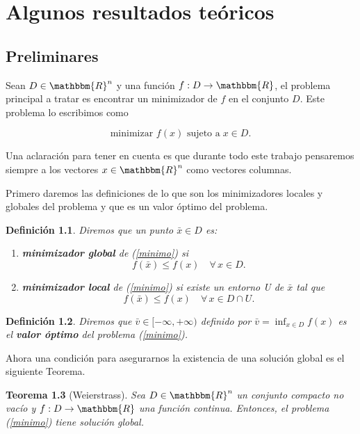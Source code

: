 \documentclass[a4paper,12pt]{report}
\newcommand{\RR}{\mathbbm{R}}
\newcommand{\Rn}{\RR^n}
\newcommand{\bx}{\bar{x}}
\newcommand{\arr}{\rightarrow}
\newtheorem{teo}{Teorema}[section]
\newtheorem{defi}[teo]{Definici\'on}
\begin{document}
\chapter{Algunos resultados te\'oricos}
\section{Preliminares}

Sean $D \in \Rn$ y una funci\'on $f: D \arr \RR$, el problema principal a tratar es encontrar un minimizador de $f$ en el conjunto $D$. Este problema lo escribimos como

\begin{equation}\label{minimo}
 \mbox{minimizar}\,\,f(x)\,\, \mbox{sujeto a}\;x \in D. 
\end{equation}

Una aclaraci\'on para tener en cuenta es que durante todo este trabajo pensaremos siempre a los vectores $x\in\Rn$ como vectores columnas.

Primero daremos las definiciones de lo que son los minimizadores locales y globales del problema y que es un valor \'optimo del problema.


\begin{defi}Diremos que un punto $\bx \in D$ es:
\begin{enumerate}
 \item \textbf{minimizador global} de (\ref{minimo}) si
  $$f(\bx)\leq f(x)\quad\forall\,x \in D.$$
 \item \textbf{minimizador local} de (\ref{minimo}) si existe un entorno U de $\bx$ tal que
$$f(\bx)\leq f(x)\quad\forall\,x \in D\cap U.$$
\end{enumerate}
\end{defi} 


\begin{defi}Diremos que $\bar{v} \in [-\infty , +\infty )$ definido por $\displaystyle \bar{v}=\inf_{x \in D} f(x)$ es el \textbf{valor \'optimo} del problema (\ref{minimo}).
\end{defi} 


Ahora una condici\'on para asegurarnos la existencia de una soluci\'on global es el siguiente Teorema.


\begin{teo}[Weierstrass]\label{weier} Sea $D \in \Rn$ un conjunto compacto no vac\'io y \linebreak $f:D \arr \RR$ una funci\'on continua.
Entonces, el problema \mbox{(\ref{minimo})} tiene soluci\'on global.
\end{teo}
\end{document}
